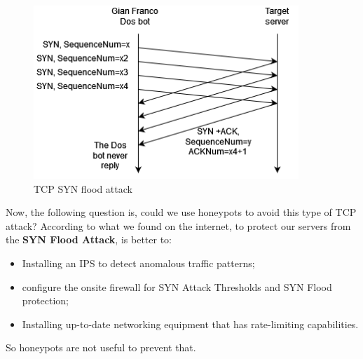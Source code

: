 \begin{figure}[h!]
\centering
\includegraphics[width = 10cm]{images/DosSYNFloodAttack.drawio.png}
\caption{TCP SYN flood attack}
\label{fig:TCPDos}
\end{figure}
\FloatBarrier
\noindent
Now, the following question is, could we use honeypots to avoid this type of TCP attack?
According to what we found on the internet, to protect our servers from the \textbf{SYN Flood Attack}, is better to:
\begin{itemize}
\item Installing an IPS to detect anomalous traffic patterns;
\item configure the onsite firewall for SYN Attack Thresholds and SYN Flood protection;
\item Installing up-to-date networking equipment that has rate-limiting capabilities.
\end{itemize}
So honeypots are not useful to prevent that.